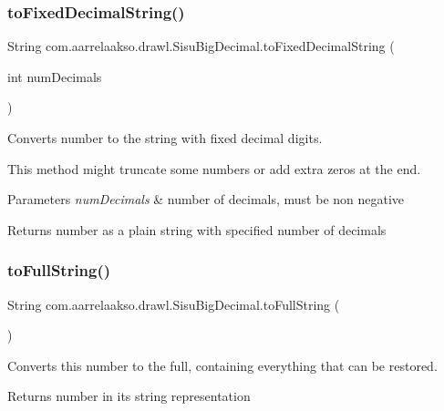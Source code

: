 \subsubsection{\texorpdfstring{to\+Fixed\+Decimal\+String()}{toFixedDecimalString()}}
{\footnotesize\ttfamily String com.\+aarrelaakso.\+drawl.\+Sisu\+Big\+Decimal.\+to\+Fixed\+Decimal\+String (\begin{DoxyParamCaption}\item[{int}]{num\+Decimals }\end{DoxyParamCaption})\hspace{0.3cm}{\ttfamily [protected]}}

Converts number to the string with fixed decimal digits. 

This method might truncate some numbers or add extra zeros at the end.


\begin{DoxyParams}{Parameters}
{\em num\+Decimals} & number of decimals, must be non negative \\
\hline
\end{DoxyParams}
\begin{DoxyReturn}{Returns}
number as a plain string with specified number of decimals 
\end{DoxyReturn}
\mbox{\label{classcom_1_1aarrelaakso_1_1drawl_1_1_sisu_big_decimal_aa1fdb9a9086d8a7a0c75f7b2acbf4931}} 
\subsubsection{\texorpdfstring{to\+Full\+String()}{toFullString()}}
{\footnotesize\ttfamily String com.\+aarrelaakso.\+drawl.\+Sisu\+Big\+Decimal.\+to\+Full\+String (\begin{DoxyParamCaption}{ }\end{DoxyParamCaption})\hspace{0.3cm}{\ttfamily [protected]}}

Converts this number to the full, containing everything that can be restored.

\begin{DoxyReturn}{Returns}
number in it\textquotesingle{}s string representation 
\end{DoxyReturn}
\mbox{\label{classcom_1_1aarrelaakso_1_1drawl_1_1_sisu_big_decimal_aad76de7e2c8ced754cc3f98f53f5e692}} 
